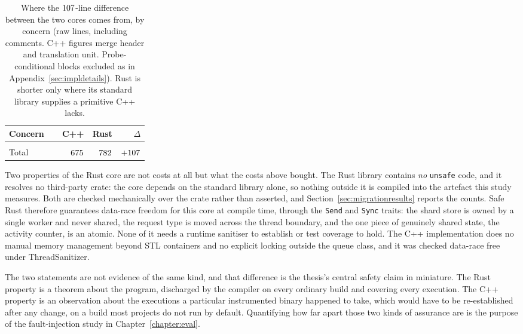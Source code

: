 \documentclass[english,oneside,a4paper,censored,csm,software-track-2020]{HYthesisML}
\begin{document}
\begin{appendices}
\begin{table}[H]
\centering
\small
\caption[Where the line-count difference between the cores comes from]{Where the $\LocGap$-line difference between the two cores comes from, by concern (raw
lines, including comments. C++ figures merge header and translation unit. Probe-conditional
blocks excluded as in Appendix~\ref{sec:impldetails}). Rust is shorter
only where its standard library supplies a primitive C++ lacks.\label{tab:loc}}
\begin{tabular}{@{}R{0.38\linewidth} r r r@{}}
\hline\hline
Concern & C++ & Rust & $\Delta$ \\
\hline
\\
\hline
Total                             & $675$ & $782$ & $+107$ \\
\hline
\end{tabular}
\end{table}

Two properties of the Rust core are not costs at all but what the costs above bought. The Rust
library contains \emph{no} \texttt{unsafe} code, and it resolves no third-party crate: the core
depends on the standard library alone, so nothing outside it is compiled into the artefact this
study measures. Both are checked mechanically over the crate rather than asserted, and
Section~\ref{sec:migrationresults} reports the counts. Safe Rust therefore guarantees data-race
freedom for this core at compile time, through the \texttt{Send} and \texttt{Sync} traits: the
shard store is owned by a single worker and never shared, the request type is moved across the
thread boundary, and the one piece of genuinely shared state, the activity counter, is an atomic.
None of it needs a runtime sanitiser to establish or test coverage to hold. The C++
implementation does no manual memory management beyond STL containers and no explicit locking
outside the queue class, and it was checked data-race free under ThreadSanitizer.

The two statements are not evidence of the same kind, and that difference is the thesis's central
safety claim in miniature. The Rust property is a theorem about the program, discharged by the
compiler on every ordinary build and covering every execution. The C++ property is an observation
about the executions a particular instrumented binary happened to take, which would have to be
re-established after any change, on a build most projects do not run by default. Quantifying how
far apart those two kinds of assurance are is the purpose of the fault-injection study in
Chapter~\ref{chapter:eval}.


\end{appendices}
\end{document}
